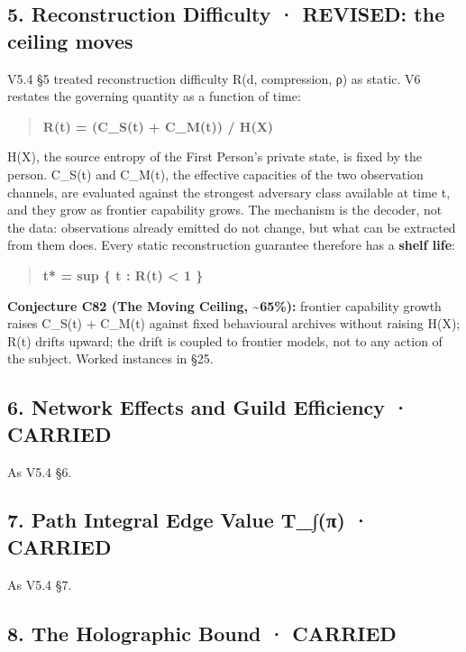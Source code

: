 \documentclass[
  11pt,
]{article}
\begin{document}
\subsection{5. Reconstruction Difficulty · REVISED: the ceiling
moves}\label{reconstruction-difficulty-revised-the-ceiling-moves}

V5.4 §5 treated reconstruction difficulty R(d, compression, ρ) as
static. V6 restates the governing quantity as a function of time:

\begin{quote}
\textbf{R(t) = (C\_S(t) + C\_M(t)) / H(X)}
\end{quote}

H(X), the source entropy of the First Person's private state, is fixed
by the person. C\_S(t) and C\_M(t), the effective capacities of the two
observation channels, are evaluated against the strongest adversary
class available at time t, and they grow as frontier capability grows.
The mechanism is the decoder, not the data: observations already emitted
do not change, but what can be extracted from them does. Every static
reconstruction guarantee therefore has a \textbf{shelf life}:

\begin{quote}
\textbf{t* = sup \{ t : R(t) \textless{} 1 \}}
\end{quote}

\textbf{Conjecture C82 (The Moving Ceiling, \textasciitilde65\%):}
frontier capability growth raises C\_S(t) + C\_M(t) against fixed
behavioural archives without raising H(X); R(t) drifts upward; the drift
is coupled to frontier models, not to any action of the subject. Worked
instances in §25.

\subsection{6. Network Effects and Guild Efficiency ·
CARRIED}\label{network-effects-and-guild-efficiency-carried}

As V5.4 §6.

\subsection{7. Path Integral Edge Value T\_∫(π) ·
CARRIED}\label{path-integral-edge-value-t_ux3c0-carried}

As V5.4 §7.

\subsection{8. The Holographic Bound ·
CARRIED}\label{the-holographic-bound-carried}
\end{document}
